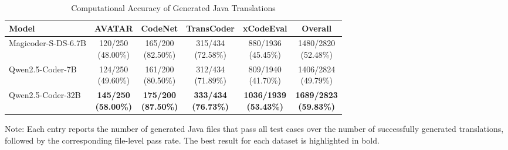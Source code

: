 \begin{table}[t]
\centering
\caption{Computational Accuracy of Generated Java Translations}
\label{tab:file_pass_rate}
\small
\setlength{\tabcolsep}{5pt}
\renewcommand{\arraystretch}{1.15}
\begin{tabular}{lccccc}
\toprule
\textbf{Model} 
& \textbf{AVATAR} 
& \textbf{CodeNet} 
& \textbf{TransCoder} 
& \textbf{xCodeEval} 
& \textbf{Overall} \\
\midrule
Magicoder-S-DS-6.7B 
& \makecell{120/250\\(48.00\%)} 
& \makecell{165/200\\(82.50\%)} 
& \makecell{315/434\\(72.58\%)} 
& \makecell{880/1936\\(45.45\%)} 
& \makecell{1480/2820\\(52.48\%)} \\

Qwen2.5-Coder-7B
& \makecell{124/250\\(49.60\%)} 
& \makecell{161/200\\(80.50\%)} 
& \makecell{312/434\\(71.89\%)} 
& \makecell{809/1940\\(41.70\%)} 
& \makecell{1406/2824\\(49.79\%)} \\

Qwen2.5-Coder-32B 
& \makecell{\textbf{145/250}\\\textbf{(58.00\%)}} 
& \makecell{\textbf{175/200}\\\textbf{(87.50\%)}} 
& \makecell{\textbf{333/434}\\\textbf{(76.73\%)}} 
& \makecell{\textbf{1036/1939}\\\textbf{(53.43\%)}} 
& \makecell{\textbf{1689/2823}\\\textbf{(59.83\%)}} \\
\bottomrule
\end{tabular}

\vspace{0.5em}
\begin{minipage}{0.95\linewidth}
\footnotesize
Note: Each entry reports the number of generated Java files that pass all test cases over the number of successfully generated translations, followed by the corresponding file-level pass rate. The best result for each dataset is highlighted in bold.
\end{minipage}
\end{table}

